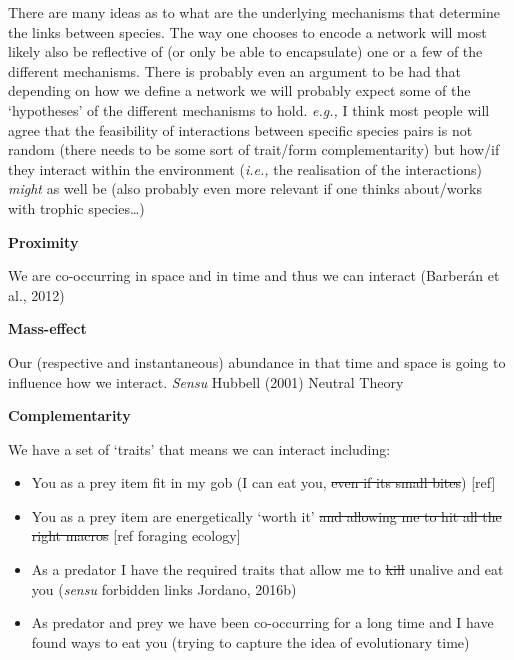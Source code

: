 \documentclass[
]{article}
\providecommand{\tightlist}{%
  \setlength{\itemsep}{0pt}\setlength{\parskip}{0pt}}\usepackage{longtable,booktabs,array}
\begin{document}
\begin{tcolorbox}[enhanced jigsaw, left=2mm, title=\textcolor{quarto-callout-note-color}{\faInfo}\hspace{0.5em}{Box 1 - Mechanisms that determine feeding links}, opacityback=0, bottomrule=.15mm, toprule=.15mm, titlerule=0mm, toptitle=1mm, leftrule=.75mm, opacitybacktitle=0.6, bottomtitle=1mm, arc=.35mm, coltitle=black, rightrule=.15mm, colbacktitle=quarto-callout-note-color!10!white, colframe=quarto-callout-note-color-frame, colback=white, breakable]

There are many ideas as to what are the underlying mechanisms that
determine the links between species. The way one chooses to encode a
network will most likely also be reflective of (or only be able to
encapsulate) one or a few of the different mechanisms. There is probably
even an argument to be had that depending on how we define a network we
will probably expect some of the `hypotheses' of the different
mechanisms to hold. \emph{e.g.,} I think most people will agree that the
feasibility of interactions between specific species pairs is not random
(there needs to be some sort of trait/form complementarity) but how/if
they interact within the environment (\emph{i.e.,} the realisation of
the interactions) \emph{might} as well be (also probably even more
relevant if one thinks about/works with trophic species\ldots)

\textbf{Proximity}

We are co-occurring in space and in time and thus we can interact
(Barberán et al., 2012)

\textbf{Mass-effect}

Our (respective and instantaneous) abundance in that time and space is
going to influence how we interact. \emph{Sensu} Hubbell (2001) Neutral
Theory

\textbf{Complementarity}

We have a set of `traits' that means we can interact including:

\begin{itemize}
\tightlist
\item
  You as a prey item fit in my gob (I can eat you, \st{even if its small
  bites}) {[}ref{]}
\item
  You as a prey item are energetically `worth it' \st{and allowing me to
  hit all the right macros} {[}ref foraging ecology{]}
\item
  As a predator I have the required traits that allow me to \st{kill}
  unalive and eat you (\emph{sensu} forbidden links Jordano, 2016b)
\item
  As predator and prey we have been co-occurring for a long time and I
  have found ways to eat you (trying to capture the idea of evolutionary
  time)
\end{itemize}


\end{tcolorbox}
\end{document}
